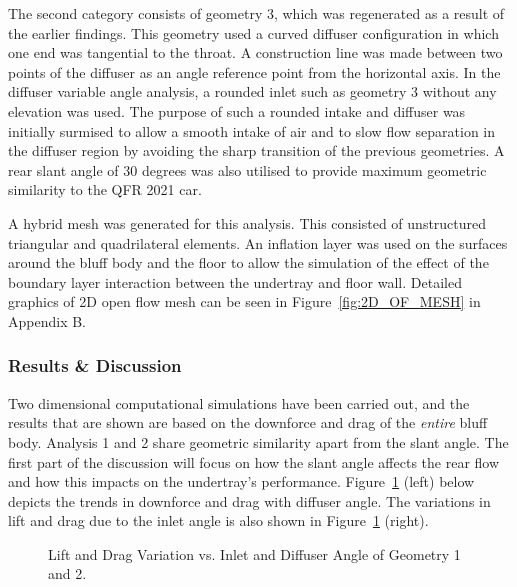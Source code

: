 \noindent The second category consists of geometry 3, which was regenerated as a result of the earlier findings. This geometry used a curved diffuser configuration in which one end was tangential to the throat. A construction line was made between two points of the diffuser as an angle reference point from the horizontal axis. In the diffuser variable angle analysis, a rounded inlet such as geometry 3 without any elevation was used. The purpose of such a rounded intake and diffuser was initially surmised to allow a smooth intake of air and to slow flow separation in the diffuser region by avoiding the sharp transition of the previous geometries. A rear slant angle of 30 degrees was also utilised to provide maximum geometric similarity to the QFR 2021 car.

\noindent A hybrid mesh was generated for this analysis. This consisted of unstructured triangular and quadrilateral elements. An inflation layer was used on the surfaces around the bluff body and the floor to allow the simulation of the effect of the boundary layer interaction between the undertray and floor wall. Detailed graphics of 2D open flow mesh can be seen in Figure~\ref{fig:2D_OF_MESH} in Appendix B.

\subsubsection{Results \& Discussion}

\noindent Two dimensional computational simulations have been carried out, and the results that are shown are based on the downforce and drag of the \textit{entire} bluff body. Analysis 1 and 2 share geometric similarity apart from the slant angle. The first part of the discussion will focus on how the slant angle affects the rear flow and how this impacts on the undertray's performance. Figure~\ref{fig:2D_OF_A12_results} (left) below depicts the trends in downforce and drag with diffuser angle. The variations in lift and drag due to the inlet angle is also shown in Figure~\ref{fig:2D_OF_A12_results} (right).

\begin{figure}[!ht]
    \noindent{}
    \caption{Lift and Drag Variation vs. Inlet and Diffuser Angle of Geometry 1 and 2.}
    \label{fig:2D_OF_A12_results}
\end{figure}

